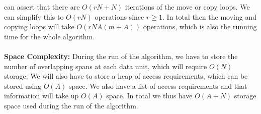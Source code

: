 can assert that there are $O(rN + N)$ iterations of the move or copy loops. We can simplify this to $O(rN)$ operations since $r \geq 1$. In total then the moving and copying loops will take
$O(rNA (m + A))$ operations, which is also the running time for the whole algorithm. \\
\\
{\bf Space Complexity:} During the run of the algorithm, we have to store the number of overlapping spans at each data unit, which will require $O(N)$ storage. We will also have to store a heap of access requirements, which can be stored using $O(A)$ space. We also have a list of access requirements and that information will take up $O(A)$ space. In total we thus have $O(A + N)$ storage space used during the run of the algorithm. 
